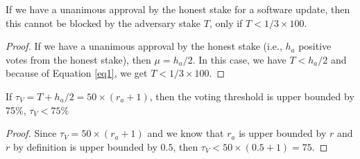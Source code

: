 \begin{lemma}
If we have a unanimous approval by the honest stake for a software update, then this cannot be blocked by the adversary stake $T$, only if $T < 1/3 \times 100$.
\end{lemma}
\begin{proof}
If we have a unanimous approval by the honest stake (i.e., $h_a$ positive votes from the honest stake), then $\mu = h_a/2$. In this case, we have $T < h_a/2$ and because of Equation \ref{eq1}, we get $T < 1/3 \times 100$.
\end{proof}

\begin{lemma}
If $\tau_V = T + h_a/2 =  50 \times (r_a + 1)$, then the voting threshold is upper bounded by 75\%, $\tau_V < 75\%$
\end{lemma}
\begin{proof}
Since $\tau_V =  50 \times (r_a + 1)$ and we know that $r_a$ is upper bounded by $r$ and $r$ by definition is upper bounded by $0.5$, then $\tau_V <  50 \times (0.5 + 1) = 75$.
\end{proof}




